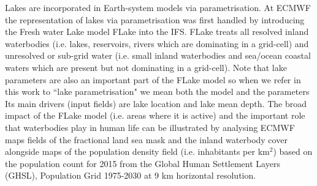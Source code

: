 \documentclass[hess, twostagejnl]{copernicus}
\providecommand{\DIFadd}[1]{{\protect\color{blue} \sf #1}} %
\providecommand{\DIFdel}[1]{{\protect\color{red} \scriptsize #1}} %
\providecommand{\DIFaddbegin}{} %
\providecommand{\DIFaddend}{} %
\providecommand{\DIFdelbegin}{} %
\providecommand{\DIFdelend}{} %
\begin{document}
\noindent Lakes are incorporated in Earth-system models via parametrisation. At ECMWF the  representation of lakes via parametrisation was first handled by introducing the Fresh water Lake model FLake \DIFdelbegin \DIFdel{\cite{Mironov2008} }\DIFdelend \DIFaddbegin \DIFadd{\citep{Mironov2008} }\DIFaddend into the IFS. FLake treats all resolved inland waterbodies (i.e. lakes, reservoirs, rivers which are dominating in a grid-cell) and unresolved or sub-grid water (i.e. small inland waterbodies and sea/ocean coastal waters which are present but not dominating in a grid-cell). \DIFdelbegin \DIFdel{Note that lake parameters are also an important part of the FLake model so when we refer in this work to ``lake parametrisation" we mean both the model and the parameters}\DIFdelend \DIFaddbegin \DIFadd{Its main drivers (input fields) are lake location and lake mean depth}\DIFaddend . The broad impact of the FLake model \DIFaddbegin \DIFadd{(i.e. areas where it is active) }\DIFaddend and the important role that waterbodies play in human life can be illustrated by analysing ECMWF \DIFdelbegin \DIFdel{maps }\DIFdelend \DIFaddbegin \DIFadd{fields }\DIFaddend of the fractional land sea mask and the inland waterbody cover alongside \DIFdelbegin \DIFdel{maps of }\DIFdelend the population density \DIFaddbegin \DIFadd{field }\DIFaddend (i.e. inhabitants per km$^2$) based on the population count for 2015 from the Global Human Settlement Layers (GHSL), Population Grid 1975-2030 \DIFdelbegin \DIFdel{\cite{GHS,JRC100523} }\DIFdelend \DIFaddbegin \DIFadd{\citep{JRC100523,GHS} }\DIFaddend at 9 km horizontal resolution. 

\DIFaddbegin 

\end{document}
